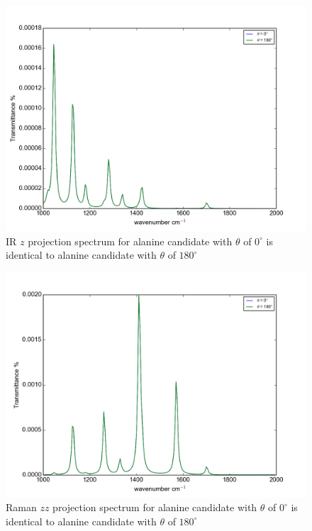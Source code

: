 \begin{figure}[!ht] 
\centering
\includegraphics[scale=0.7]{Figures/Ala_candidates_plotting_ir_z_2.png}
\caption{IR $z$ projection spectrum for alanine candidate with $\theta$ of $0^{\circ}$ is identical to alanine candidate with $\theta$ of $180^{\circ}$} \label{fig:5.7}
\end{figure}

\begin{figure}[!ht] 
\centering
\includegraphics[scale=0.7]{Figures/Ala_candidates_plotting_raman_zz_2.png}
\caption{Raman $zz$ projection spectrum for alanine candidate with $\theta$ of $0^{\circ}$ is identical to alanine candidate with $\theta$ of $180^{\circ}$} \label{fig:5.8}
\end{figure}

